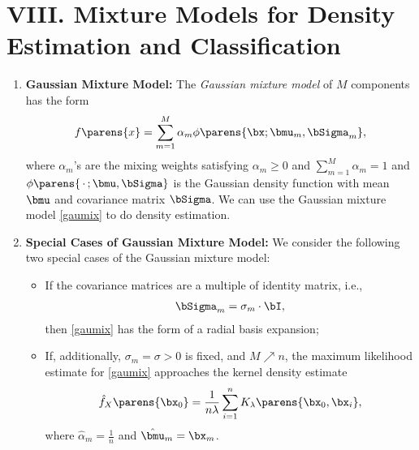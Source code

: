 \documentclass[12pt]{article}
\begin{document}
\section*{VIII. Mixture Models for Density Estimation and Classification} 

\begin{enumerate}[label=\textbf{\arabic*.}]

	\item \textbf{Gaussian Mixture Model:} The \emph{Gaussian mixture model} of $M$ components has the form 
	\begin{equation}\label{gaumix}
		f \parens{x} = \sum_{m=1}^M \alpha_m \phi \parens{\bx; \bmu_m, \bSigma_m}, 
	\end{equation}
	where $\alpha_m$'s are the mixing weights satisfying $\alpha_m \ge 0$ and $\sum_{m=1}^M \alpha_m = 1$ and $\phi \parens{\,\cdot\,; \bmu, \bSigma}$ is the Gaussian density function with mean $\bmu$ and covariance matrix $\bSigma$. We can use the Gaussian mixture model \eqref{gaumix} to do density estimation. 
	
	\item \textbf{Special Cases of Gaussian Mixture Model:} We consider the following two special cases of the Gaussian mixture model: 
	\begin{itemize}
		\item If the covariance matrices are a multiple of identity matrix, i.e., 
		\begin{align*}
			\bSigma_m = \sigma_m\cdot \bI, 
		\end{align*}
		then \eqref{gaumix} has the form of a radial basis expansion; 
		
		\item If, additionally, $\sigma_m = \sigma > 0$ is fixed, and $M \nearrow n$, the maximum likelihood estimate for \eqref{gaumix} approaches the kernel density estimate 
		\begin{align*}
			\hat{f}_X \parens{\bx_0} = \frac{1}{n \lambda} \sum_{i=1}^n K_\lambda \parens{\bx_0, \bx_i}, 
		\end{align*}
		where $\hat{\alpha}_m = \frac{1}{n}$ and $\hat{\bmu}_m = \bx_m$. 
	\end{itemize}
	

\end{enumerate}

\printbibliography
\end{document}
